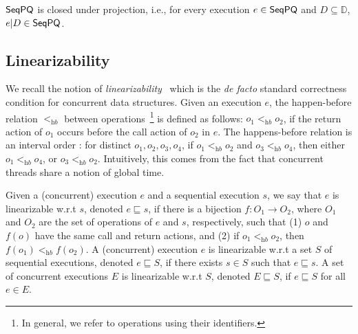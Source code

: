 \begin{lemma}
$\mathsf{SeqPQ}$ is closed under projection, i.e., for every execution $e\in \mathsf{SeqPQ}$ and $D \subseteq \mathbb{D}$, $e \vert D\in \mathsf{SeqPQ}$.
\end{lemma}


\subsection{Linearizability}\label{ssec:lin}

%
We recall the notion of \emph{linearizability}~\cite{journals/toplas/HerlihyW90} which is the \emph{de facto} standard correctness condition for concurrent data structures.
Given an execution $e$, the happen-before relation $<_{\textit{hb}}$ between operations~\footnote{In general, we refer to operations using their identifiers.} is defined as follows: $o_1 <_{\textit{hb}} o_2$, if the return action of $o_1$ occurs before the call action of $o_2$ in $e$. The happens-before relation is an interval order \cite{DBLP:conf/popl/BouajjaniEEH15}: for distinct $o_1,o_2,o_3,o_4$, if $o_1 <_{\textit{hb}} o_2$ and $o_3 <_{\textit{hb}} o_4$, then either $o_1 <_{\textit{hb}} o_4$, or $o_3 <_{\textit{hb}} o_2$. Intuitively, this comes from the fact that concurrent threads share a notion of global time.

Given a (concurrent) execution $e$ and a sequential execution $s$, we say that $e$ is linearizable w.r.t $s$, denoted $e \sqsubseteq s$, if there is a bijection $f: O_1 \rightarrow O_2$, where $O_1$ and $O_2$ are the set of operations of $e$ and $s$, respectively, such that (1) $o$ and $f(o)$ have the same call and return actions, and (2) if $o_1 <_{\textit{hb}} o_2$, then $f(o_1) <_{\textit{hb}} f(o_2)$.
A (concurrent) execution $e$ is linearizable w.r.t a set $S$ of sequential executions, denoted $e \sqsubseteq S$, if there exists $s \in S$ such that $e \sqsubseteq s$. A set of concurrent executions $E$ is linearizable w.r.t $S$, denoted $E \sqsubseteq S$, if $e \sqsubseteq S$ for all $e \in E$.

